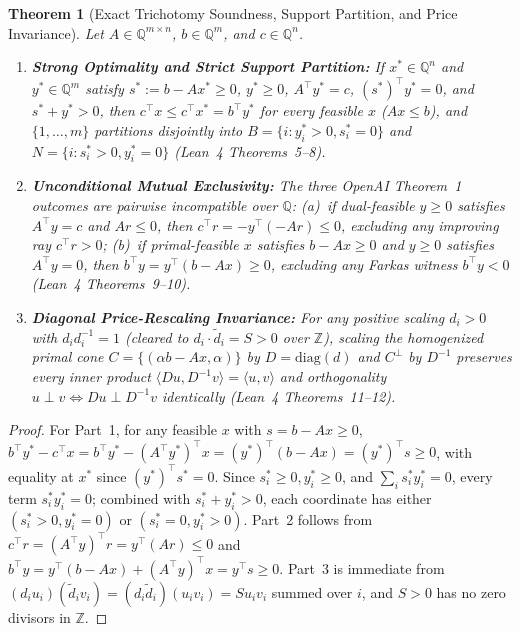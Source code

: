 \documentclass[11pt,a4paper]{article}
\newtheorem{theorem}{Theorem}[section]
\theoremstyle{definition}
\theoremstyle{remark}
\newcommand{\QQ}{\mathbb{Q}}
\newcommand{\ZZ}{\mathbb{Z}}
\begin{document}
\begin{theorem}[Exact Trichotomy Soundness, Support Partition, and Price Invariance]\label{thm:trichotomy}
Let $A \in \QQ^{m\times n}$, $b \in \QQ^m$, and $c \in \QQ^n$.
\begin{enumerate}[leftmargin=1.8em,itemsep=2pt]
  \item \textbf{Strong Optimality and Strict Support Partition:} If $x^* \in \QQ^n$ and $y^* \in \QQ^m$ satisfy $s^* := b - Ax^* \ge 0$, $y^* \ge 0$, $A^\top y^* = c$, $(s^*)^\top y^* = 0$, and $s^* + y^* > 0$, then $c^\top x \le c^\top x^* = b^\top y^*$ for every feasible $x$ ($Ax \le b$), and $\{1,\dots,m\}$ partitions disjointly into $B = \{i : y^*_i > 0, s^*_i = 0\}$ and $N = \{i : s^*_i > 0, y^*_i = 0\}$ (Lean~4 Theorems~5--8).
  \item \textbf{Unconditional Mutual Exclusivity:} The three OpenAI Theorem~1 outcomes are pairwise incompatible over $\QQ$: (a)~if dual-feasible $y \ge 0$ satisfies $A^\top y = c$ and $Ar \le 0$, then $c^\top r = -y^\top(-Ar) \le 0$, excluding any improving ray $c^\top r > 0$; (b)~if primal-feasible $x$ satisfies $b - Ax \ge 0$ and $y \ge 0$ satisfies $A^\top y = 0$, then $b^\top y = y^\top(b - Ax) \ge 0$, excluding any Farkas witness $b^\top y < 0$ (Lean~4 Theorems~9--10).
  \item \textbf{Diagonal Price-Rescaling Invariance:} For any positive scaling $d_i > 0$ with $d_i d_i^{-1} = 1$ (cleared to $d_i \cdot \tilde d_i = S > 0$ over $\ZZ$), scaling the homogenized primal cone $C = \{(\alpha b - Ax, \alpha)\}$ by $D = \mathrm{diag}(d)$ and $C^\perp$ by $D^{-1}$ preserves every inner product $\langle D u, D^{-1} v \rangle = \langle u, v \rangle$ and orthogonality $u \perp v \iff Du \perp D^{-1}v$ identically (Lean~4 Theorems~11--12).
\end{enumerate}
\end{theorem}

\begin{proof}
For Part~1, for any feasible $x$ with $s = b - Ax \ge 0$, $b^\top y^* - c^\top x = b^\top y^* - (A^\top y^*)^\top x = (y^*)^\top(b - Ax) = (y^*)^\top s \ge 0$, with equality at $x^*$ since $(y^*)^\top s^* = 0$. Since $s^*_i \ge 0, y^*_i \ge 0$, and $\sum_i s^*_i y^*_i = 0$, every term $s^*_i y^*_i = 0$; combined with $s^*_i + y^*_i > 0$, each coordinate has either $(s^*_i > 0, y^*_i = 0)$ or $(s^*_i = 0, y^*_i > 0)$. Part~2 follows from $c^\top r = (A^\top y)^\top r = y^\top(Ar) \le 0$ and $b^\top y = y^\top(b - Ax) + (A^\top y)^\top x = y^\top s \ge 0$. Part~3 is immediate from $(d_i u_i)(\tilde d_i v_i) = (d_i \tilde d_i)(u_i v_i) = S u_i v_i$ summed over $i$, and $S > 0$ has no zero divisors in $\ZZ$.
\end{proof}
\end{document}
